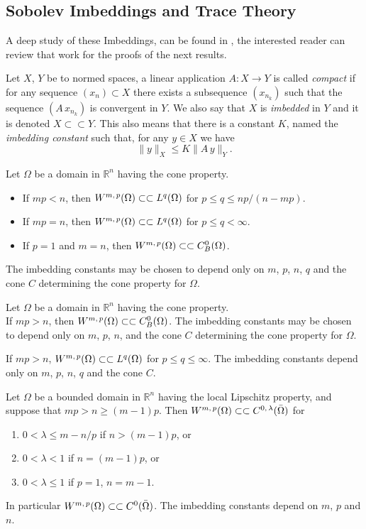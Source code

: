\subsection*{Sobolev Imbeddings and Trace Theory}\label{sec:sobolev_imbeddings} A deep study of these Imbeddings, can be found in \cite{adams1975}, the interested reader can review that work for the proofs of the next results.
\begin{definition}
Let $X$, $Y$ be to normed spaces, a linear application $A:X\rightarrow Y$ is called \emph{compact} if for any sequence $(x_n)\subset X$ there exists a subsequence $(x_{n_k})$ such that the sequence $(A\,x_{n_k})$ is convergent in $Y$. We also say that $X$ is \emph{imbedded} in $Y$ and it is denoted $X\subset\subset Y$. This also means that there is a constant $K$, named the \emph{imbedding constant} such that, for any $y\in X$ we have $$\|y\|_X\leq K \|A\,y\|_Y.$$
\end{definition}
\begin{theorem}
Let $\Omega$ be a domain in $\mathbb{R}^n$ having the cone property.
\begin{itemize}
\item If $mp<n$, then ${W^{m,\,p}(\Omega)}\subset \subset {L^{q}(\Omega)}$ for $p\leq q \leq np/(n-mp)$.
\item  If $mp=n$, then ${W^{m,\,p}(\Omega)}\subset \subset {L^{q}(\Omega)}$ for $p\leq q<\infty$.
\item  If $p=1$ and $m=n$, then ${W^{m,\,p}(\Omega)}\subset \subset C_B^0(\Omega)$.
\end{itemize}
 The imbedding constants may be chosen to depend only on  $m$, $p$, $n$, $q$ and the cone $C$ determining the cone property for $\Omega$.
\end{theorem}
\begin{theorem}
Let $\Omega$ be a domain in $\mathbb{R}^n$ having the cone property. \\If $mp>n$, then ${W^{m,\,p}(\Omega)}\subset \subset C_B^0(\Omega)$. The imbedding constants may be chosen to depend only on  $m$, $p$, $n$, and the cone $C$ determining the cone property for $\Omega$.
\end{theorem}
\begin{corollary}
If $mp>n$, ${W^{m,\,p}(\Omega)}\subset \subset {L^{q}(\Omega)}$ for $p\leq q\leq\infty$. The imbedding constants depend only on  $m$, $p$, $n$, $q$ and the cone $C$.
\end{corollary}
\begin{theorem}
Let $\Omega$ be a bounded domain in $\mathbb{R}^n$ having the local Lipschitz property, and suppose that $mp>n\geq (m-1)p$. Then ${W^{m,\,p}(\Omega)}\subset \subset C^{0,\,\lambda}(\bar{\Omega})$ for
\begin{enumerate}
\item $0<\lambda\leq m-n/p$ if $n>(m-1)p$, or
\item $0<\lambda < 1$ if $n=(m-1)p$, or 
\item $0<\lambda \leq 1$ if $p=1$, $n=m-1$.
\end{enumerate}
In particular ${W^{m,\,p}(\Omega)}\subset \subset C^0(\bar{\Omega})$. The imbedding constants depend on $m$, $p$ and $n$.
\end{theorem}
